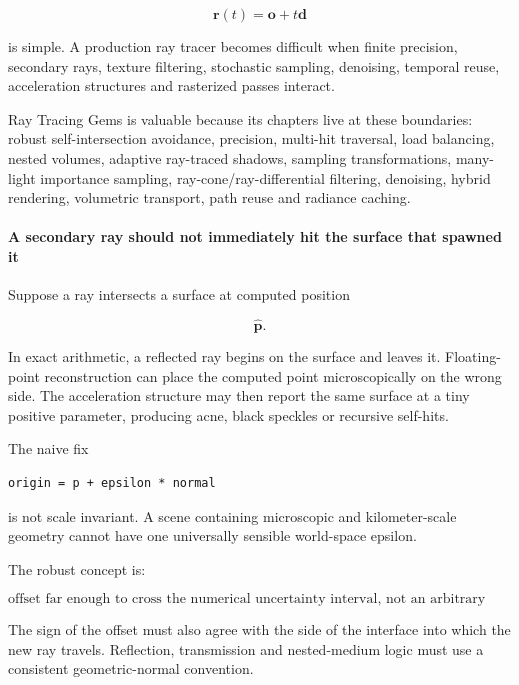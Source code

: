 \[
\mathbf r(t)=\mathbf o+t\mathbf d
\]

is simple. A production ray tracer becomes difficult when finite precision, secondary rays, texture filtering, stochastic sampling, denoising, temporal reuse, acceleration structures and rasterized passes interact.

Ray Tracing Gems is valuable because its chapters live at these boundaries: robust self-intersection avoidance, precision, multi-hit traversal, load balancing, nested volumes, adaptive ray-traced shadows, sampling transformations, many-light importance sampling, ray-cone/ray-differential filtering, denoising, hybrid rendering, volumetric transport, path reuse and radiance caching.

\paragraph{A secondary ray should not immediately hit the surface that spawned it}\label{03-visual-computing-i-ch001-a-secondary-ray-should-not-immediately-hit-the-surface-that-spawned-it}

\hypertarget{03-visual-computing-i-ch001-a-secondary-ray-should-not-immediately-hit-the-surface-that-spawned-it}{}

Suppose a ray intersects a surface at computed position

\[
\widehat{\mathbf p}.
\]

In exact arithmetic, a reflected ray begins on the surface and leaves it. Floating-point reconstruction can place the computed point microscopically on the wrong side. The acceleration structure may then report the same surface at a tiny positive parameter, producing acne, black speckles or recursive self-hits.

The naive fix

\begin{verbatim}
origin = p + epsilon * normal
\end{verbatim}

is not scale invariant. A scene containing microscopic and kilometer-scale geometry cannot have one universally sensible world-space epsilon.

The robust concept is:

\[
\boxed{
\text{offset far enough to cross the numerical uncertainty interval,
not an arbitrary visual distance}
}
\]

The sign of the offset must also agree with the side of the interface into which the new ray travels. Reflection, transmission and nested-medium logic must use a consistent geometric-normal convention.

